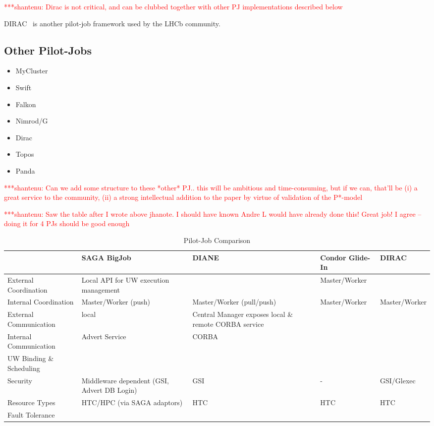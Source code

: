 \documentclass[conference,final]{IEEEtran}
\newcommand{\jhanote}[1]{ {\textcolor{red} { ***shantenu: #1 }}}
\newcommand{\jhanote}[1]{}
\begin{document}
\jhanote{Dirac is not critical, and can be clubbed together with other
  PJ implementations described below}

DIRAC~\cite{1742-6596-219-6-062049} is another pilot-job framework used by the 
LHCb community.

\subsection{Other Pilot-Jobs}

\begin{itemize}
    \item MyCluster
    \item Swift
    \item Falkon
    \item Nimrod/G
    \item Dirac
    \item Topos
    \item Panda    
\end{itemize}

\jhanote{Can we add some structure to these *other* PJ.. this will be
  ambitious and time-consuming, but if we can, that'll be (i) a great
  service to the community, (ii) a strong intellectual addition to the
  paper by virtue of validation of the P*-model}

\jhanote{Saw the table after I wrote above jhanote. I should have
  known Andre L would have already done this! Great job! I agree --
  doing it for 4 PJs should be good enough}

\begin{table}[t]
\centering
\begin{tabular}{|l|p{2.5cm}|p{2.5cm}|p{2.5cm}|p{2.5cm}|}
	\hline
	&\textbf{SAGA BigJob} &\textbf{DIANE} &\textbf{Condor Glide-In} &   
	\textbf{DIRAC} \\ \hline
External Coordination &Local API for UW execution management & &Master/Worker &\\ \hline

Internal Coordination &Master/Worker (push) &Master/Worker (pull/push) &Master/Worker &Master/Worker\\ \hline

External Communication &local &Central Manager exposes local \& remote CORBA service & &\\ \hline
	
Internal Communication &Advert Service &CORBA & & \\ \hline

UW Binding \& Scheduling &&&&\\ \hline

Security &Middleware dependent (GSI, Advert DB Login) &GSI &- &GSI/Glexec\\ \hline

Resource Types &HTC/HPC (via SAGA adaptors) &HTC &HTC &HTC \\ \hline

Fault Tolerance  &&&&\\ \hline
	
\end{tabular}
\caption{Pilot-Job Comparison}
\end{table}
\end{document}
